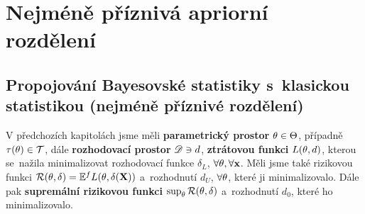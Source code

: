 \chapter{Nejméně příznivá apriorní rozdělení}

\section{Propojování Bayesovské statistiky s~klasickou statistikou (nejméně příznivé rozdělení)}
V předchozích kapitolách jsme měli \textbf{parametrický prostor} $\theta\in\Theta$, případně $\tau(\theta)\in\mathcal{T}$, dále \textbf{rozhodovací prostor} $\mathscr{D}\ni d $, \textbf{ztrátovou funkci}  $L(\theta,d)$, kterou se~nažila minimalizovat rozhodovací funkce $\delta_L$, $\forall \theta,\forall \textbf{x}$. Měli jsme také rizikovou funkci $\mathcal{R}(\theta,\delta)=\mathbb{E}^fL(\theta,\delta(\textbf{X}))$ a~rozhodnutí $d_U$, $\forall\theta$, které ji minimalizovalo. Dále pak \textbf{supremální rizikovou funkci} $\sup_\theta\mathcal{R}(\theta,\delta)$ a~rozhodnutí $d_0$, které ho minimalizovalo. 


